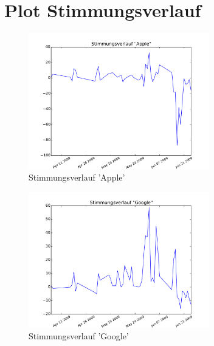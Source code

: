 \documentclass[12pt, oneside]{report}   	%
\begin{document}
\section{Plot Stimmungsverlauf}

\begin{figure}[h]
\begin{center}
\includegraphics[width=0.7\textwidth]{bilder/moodPlotApple.pdf}
\caption{Stimmungsverlauf 'Apple'}
\label{img:moodplot1}
\end{center}
\end{figure}

\begin{figure}[h]
\begin{center}
\includegraphics[width=0.7\textwidth]{bilder/moodPlotGoogle.pdf}
\caption{Stimmungsverlauf 'Google'}
\label{img:moodplot2}
\end{center}
\end{figure}
\end{document}
